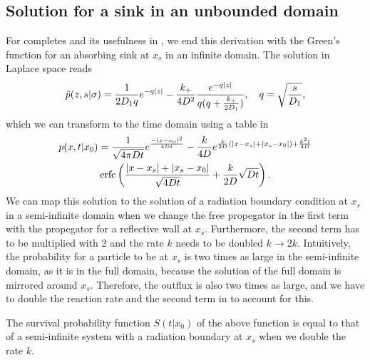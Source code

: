 \subsection{Solution for a sink in an unbounded domain}
For completes and its usefulness in \GFRD, we end this derivation with the Green's function for an absorbing sink at $x_s$ in an infinite domain. The solution in Laplace space reads
\begin{equation}
 \hat{p}(z,s|\sigma) = \frac{1}{2 D_1 q}e^{-q|z|} - \frac{k_+}{4 D^2}\frac{e^{-q|z|}}{q(q+\frac{k_+}{2 D_1})}, \quad q=\sqrt{\frac{s}{D_1}},
 \elabel{LSOL_NB}
\end{equation}
which we can transform to the time domain using a table in \cite{Carslaw1959}
\begin{multline}
 p(x,t|x_0) = \frac{1}{\sqrt{4 \pi D t}}e^{\frac{-(x-x_0)^2}{4 D t}} - \frac{k}{4 D}e^{\frac{k}{2 D}(|x-x_s|+|x_s-x_0|)+\frac{k^2 t}{4 D}} \\
\mathrm{erfc}\left( \frac{|x-x_s|+|x_s-x_0|}{\sqrt{4 D t}}+\frac{k}{2D}\sqrt{D t} \right).
\elabel{FSOL_NB}
\end{multline}
We can map this solution to the solution of a radiation boundary condition at $x_s$ in a semi-infinite domain when we change the free propegator in the first term with the propegator for a reflective wall at $x_s$. Furthermore, the second term has to be multiplied with 2 and the rate $k$ needs to be doubled $k \rightarrow 2 k$. Intuitively, the probability for a particle to be at $x_s$ is two times as large in the semi-infinite domain, as it is in the full domain, because the solution of the full domain is mirrored around $x_s$. Therefore, the outflux is also two times as large, and we have to double the reaction rate and the second term in  to account for this.

The survival probability function $S(t|x_0)$ of the above function is equal to that of a semi-infinite system with a radiation boundary at $x_s$ when we double the rate $k$.